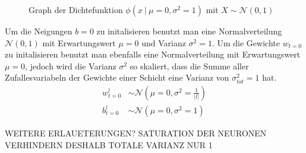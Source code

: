 \documentclass[../main]{subfiles}
\begin{document}
\begin{figure}[h!]
  \centering
  \caption{Graph der Dichtefunktion $\phi(x\ |\ \mu=0,\sigma^2=1)$ mit $X\sim\mathcal{N}(0,1)$}%
\end{figure}


Um die Neigungen $b=0$ zu initalisieren benutzt man eine Normalverteilung
$\mathcal{N}(0,1)$ mit Erwartungswert $\mu = 0$ und Varianz $\sigma^2 =
1$. Um die Gewichte $w_{t=0}$ zu initalisieren benutzt man ebenfalls eine
Normalverteilung mit Erwartungswert $\mu = 0$, jedoch wird die Varianz
$\sigma^2$ so skaliert, dass die Summe aller Zufallesvariabeln der Gewichte
einer Schicht eine Varianz von $\sigma^2_{tot} = 1$ hat.
\begin{align}
  w_{t=0}^l &\sim \mathcal{N}(\mu = 0, \sigma^2 = \frac{1}{|l|}) \\
  b_{t=0}^l &\sim \mathcal{N}(\mu = 0, \sigma^2 = 1)
\end{align}


WEITERE ERLAUETERUNGEN? SATURATION DER NEURONEN VERHINDERN DESHALB TOTALE VARIANZ
NUR 1

\para{}
\cite{wiki:normal_distribution}
\cite{Nielsen}
\end{document}
